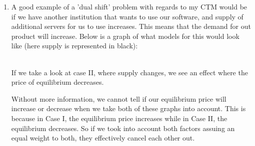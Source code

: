 \documentclass[12pt]{article}
\begin{document}
\begin{enumerate}
\item
    A good example of a 'dual shift' problem with regards to my CTM would be if we have another institution that wants to use our software, and supply of additional servers for us to use increases. This means that the demand for out product will increase. Below is a graph of what models for this would look like (here supply is represented in black): \\


\hfill \\
If we take a look at case II, where supply changes, we see an effect where the price of equilibrium decreases. 


Without more information, we cannot tell if our equilibrium price will increase or decrease when we take both of these graphs into account. This is because in Case I, the equilibrium price increases while in Case II, the equilibrium decreases. So if we took into account both factors assuing an equal weight to both, they effectively cancel each other out. 


\end{enumerate}
\end{document}
